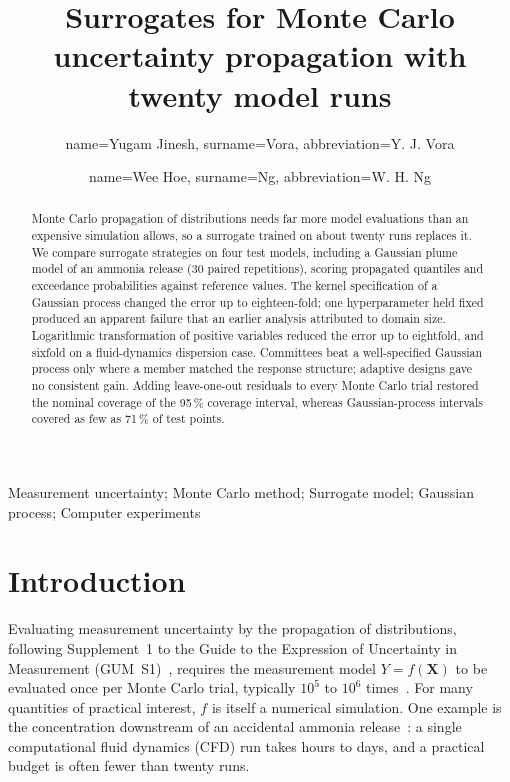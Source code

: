 \documentclass{imeko_wc}
\begin{document}
\title{Surrogates for Monte Carlo uncertainty propagation with twenty model
runs}

\author[a1]{name=Yugam Jinesh, surname=Vora, abbreviation=Y. J. Vora}
\author[a2]{name=Wee Hoe, surname=Ng, abbreviation=W. H. Ng}
\funding{}

\maketitle

\begin{abstract}
Monte Carlo propagation of distributions needs far more model evaluations
than an expensive simulation allows, so a surrogate trained on about twenty
runs replaces it. We compare surrogate strategies on four test
models, including a Gaussian plume model of an ammonia release (30 paired
repetitions), scoring propagated quantiles and exceedance probabilities
against reference values. The kernel specification of a Gaussian process
changed the error up to eighteen-fold; one hyperparameter held fixed produced
an apparent failure that an earlier analysis attributed to domain size.
Logarithmic transformation of positive variables reduced the error up to
eightfold, and sixfold on a fluid-dynamics dispersion case. Committees beat a
well-specified Gaussian process only where a member matched the response
structure;
adaptive designs gave no consistent gain. Adding
leave-one-out residuals to every Monte Carlo trial restored the nominal
coverage of the 95\,\% coverage interval, whereas Gaussian-process intervals
covered as few as 71\,\% of test points.
\end{abstract}

\begin{keywords}
Measurement uncertainty; Monte Carlo method; Surrogate model; Gaussian process;
Computer experiments
\end{keywords}

\section{Introduction}
Evaluating measurement uncertainty by the propagation of distributions,
following Supplement~1 to the Guide to the Expression of Uncertainty in
Measurement (GUM~S1)~\cite{jcgm100,jcgm101}, requires the measurement model
$Y=f(\mathbf{X})$ to be evaluated once per Monte Carlo trial, typically
$10^5$ to $10^6$ times~\cite{cox2006,harris2014}. For many quantities of
practical interest, $f$ is itself a numerical simulation. One example is the
concentration downstream of an accidental ammonia release~\cite{tan2017}: a
single computational fluid dynamics (CFD) run takes hours to days, and a
practical budget is often fewer than twenty runs.
\end{document}
